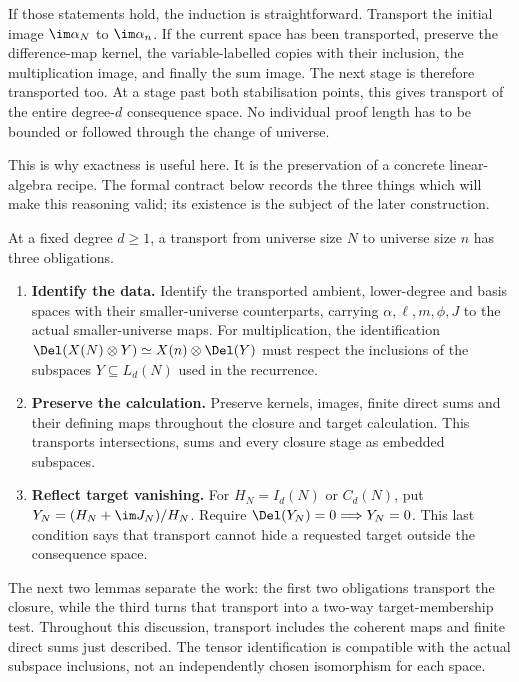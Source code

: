 If those statements hold, the induction is straightforward.
Transport the initial image $\im\alpha_N$ to $\im\alpha_n$.
If the current space has been transported, preserve the difference-map
kernel, the variable-labelled copies with their inclusion, the
multiplication image, and finally the sum image.
The next stage is therefore transported too.
At a stage past both stabilisation points, this gives transport of
the entire degree-$d$ consequence space.
No individual proof length has to be bounded or followed through the
change of universe.

This is why exactness is useful here. It is the preservation of a
concrete linear-algebra recipe. The formal contract below records the
three things which will make this reasoning valid; its existence
is the subject of the later construction.

\begin{definition}\label{tx:def:polynomial-diagram}
At a fixed degree $d\ge1$, a transport from universe size $N$ to universe size $n$
has three obligations.
\begin{enumerate}
\item \textbf{Identify the data.} Identify the transported ambient,
lower-degree and basis spaces with their smaller-universe counterparts,
carrying $\alpha,\ell,m,\phi,J$ to the actual smaller-universe maps.
For multiplication, the identification
$\Del(X(N)\otimes Y)\simeq X(n)\otimes\Del(Y)$ must respect the
inclusions of the subspaces $Y\subseteq L_d(N)$ used in the recurrence.
\item \textbf{Preserve the calculation.} Preserve kernels, images,
finite direct sums and their defining maps throughout the closure and
target calculation. This transports intersections, sums and every
closure stage as embedded subspaces.
\item \textbf{Reflect target vanishing.} For $H_N=I_d(N)$ or $C_d(N)$,
put $Y_N=(H_N+\im J_N)/H_N$. Require
$\Del(Y_N)=0\Longrightarrow Y_N=0$. This last condition says that
transport cannot hide a requested target outside the consequence space.
\end{enumerate}
\end{definition}

The next two lemmas separate the work: the first two obligations
transport the closure, while the third turns that transport into a
two-way target-membership test.
Throughout this discussion, transport includes the coherent maps and
finite direct sums just described. The tensor identification is
compatible with the actual subspace inclusions, not an independently
chosen isomorphism for each space.

